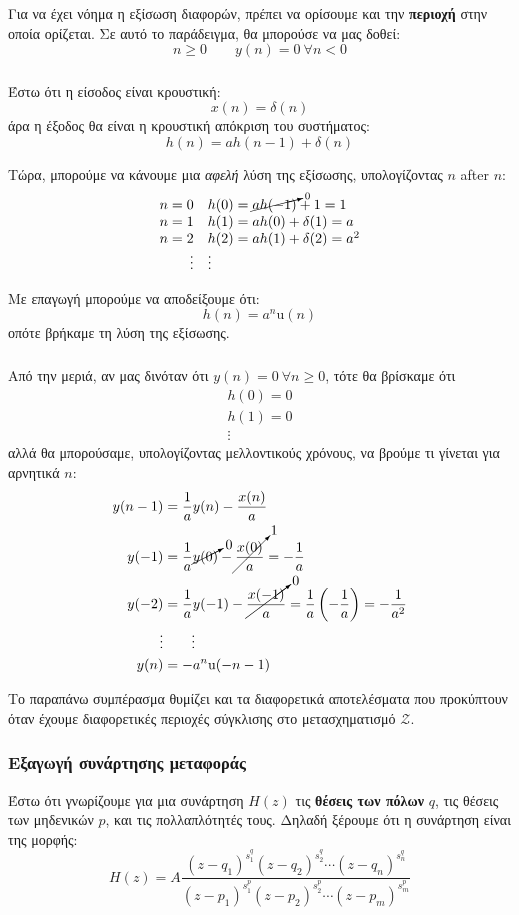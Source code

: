 \documentclass[11pt,a4paper,notitlepage,fleqn]{article}
\begin{document}
Για να έχει νόημα η εξίσωση διαφορών, πρέπει να ορίσουμε και την \textbf{περιοχή} στην οποία
ορίζεται. Σε αυτό το παράδειγμα, θα μπορούσε να μας δοθεί:
\[
n \geq 0 \qquad y(n) = 0 \ \forall n < 0
\]

\subparagraph{}
Έστω ότι η είσοδος είναι κρουστική: \[
x(n) = \delta(n)
\]
άρα η έξοδος θα είναι η κρουστική απόκριση του συστήματος:
\[
h(n) = ah(n-1) + \delta(n)
\]

Τώρα, μπορούμε να κάνουμε μια \emph{αφελή} λύση της εξίσωσης, υπολογίζοντας \( n \) after \( n \):
\[
\begin{array}{rl}
n=0 & h(0) = \cancelto{0}{ah(-1)}+1 = 1\\
n=1 & h(1) = ah(0) + \delta(1) = a\\
n=2 & h(2) = ah(1) + \delta(2) = a^2\\
\vdots & \vdots 
\end{array}
\]

Με επαγωγή μπορούμε να αποδείξουμε ότι:
\[
h(n) = a^n \mathrm{u}(n)
\]
οπότε βρήκαμε τη λύση της εξίσωσης.

\subparagraph{}
Από την μεριά, αν μας δινόταν ότι \( y(n) = 0\ \forall n \geq 0 \), τότε θα βρίσκαμε ότι
\begin{gather}
	h(0) = 0\\h(1) = 0 \\ \vdots
\end{gather}
αλλά θα μπορούσαμε, υπολογίζοντας μελλοντικούς χρόνους, να βρούμε τι γίνεται για αρνητικά \( n \):
\begin{align*}
	y(n-1) &= \frac{1}{a}y(n) - \frac{x(n)}{a}\\
	y(-1) &= \frac{1}{a}\cancelto{0}{y(0)} - \cancelto{1}{\frac{x(0)}{a}} = -\frac{1}{a}\\
	y(-2) &= \frac{1}{a}y(-1) - \cancelto{0}{\frac{x(-1)}{a}} = \frac{1}{a}\left(-\frac{1}{a}\right)=-\frac{1}{a^2} \\
	\vdots & \qquad \vdots \\
	y(n) &= -a^n\mathrm u(-n-1)
\end{align*}

Το παραπάνω συμπέρασμα θυμίζει και τα διαφορετικά αποτελέσματα που προκύπτουν όταν έχουμε διαφορετικές περιοχές
σύγκλισης στο μετασχηματισμό \( \mathcal{Z} \).

\subsubsection{Εξαγωγή συνάρτησης μεταφοράς}
Έστω ότι γνωρίζουμε για μια συνάρτηση \( H(z) \) τις \textbf{θέσεις των πόλων } \( q \), τις θέσεις των
μηδενικών \( p \), και τις πολλαπλότητές τους. Δηλαδή ξέρουμε ότι η συνάρτηση είναι της μορφής:
\[
H(z) = A
\frac{(z-q_1)^{s_1^q}(z-q_2)^{s_2^q} \cdots (z-q_n)^{s_n^q} }{(z-p_1)^{s_1^p}(z-p_2)^{s_2^p} \cdots (z-p_m)^{s_m^p}}
\]
\end{document}
